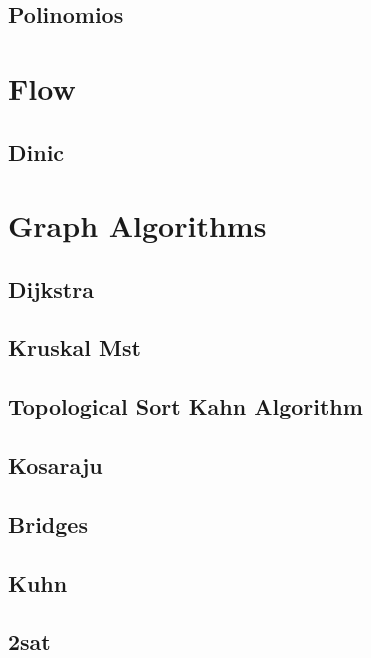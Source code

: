 \documentclass[10pt]{article}
\begin{document}
\subsection{\texorpdfstring{{Polinomios}}{{Polinomios}}}


\section{Flow}
\subsection{\texorpdfstring{{Dinic}}{{Dinic}}}


\section{Graph Algorithms}
\subsection{\texorpdfstring{{Dijkstra}}{{Dijkstra}}}

\subsection{\texorpdfstring{{Kruskal Mst}}{{Kruskal Mst}}}

\subsection{\texorpdfstring{{Topological Sort Kahn Algorithm}}{{Topological Sort Kahn Algorithm}}}

\subsection{\texorpdfstring{{Kosaraju}}{{Kosaraju}}}

\subsection{\texorpdfstring{{Bridges}}{{Bridges}}}

\subsection{\texorpdfstring{{Kuhn}}{{Kuhn}}}

\subsection{\texorpdfstring{{2sat}}{{2sat}}}

\end{document}
